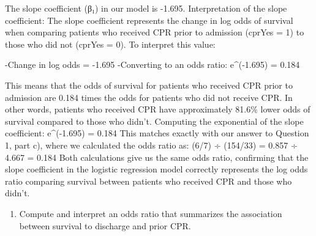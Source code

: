 \documentclass[
]{article}
\newenvironment{Shaded}{\begin{snugshade}}{\end{snugshade}}
\newcommand{\CommentTok}[1]{\textcolor[rgb]{0.56,0.35,0.01}{\textit{#1}}}
\newcommand{\FunctionTok}[1]{\textcolor[rgb]{0.13,0.29,0.53}{\textbf{#1}}}
\newcommand{\NormalTok}[1]{#1}
\newcommand{\OtherTok}[1]{\textcolor[rgb]{0.56,0.35,0.01}{#1}}
\newcommand{\SpecialCharTok}[1]{\textcolor[rgb]{0.81,0.36,0.00}{\textbf{#1}}}
\newcommand{\StringTok}[1]{\textcolor[rgb]{0.31,0.60,0.02}{#1}}
\providecommand{\tightlist}{%
  \setlength{\itemsep}{0pt}\setlength{\parskip}{0pt}}
\begin{document}
The slope coefficient (β₁) in our model is -1.695. Interpretation of the
slope coefficient: The slope coefficient represents the change in log
odds of survival when comparing patients who received CPR prior to
admission (cprYes = 1) to those who did not (cprYes = 0). To interpret
this value:

-Change in log odds = -1.695 -Converting to an odds ratio: e\^{}(-1.695)
= 0.184

This means that the odds of survival for patients who received CPR prior
to admission are 0.184 times the odds for patients who did not receive
CPR. In other words, patients who received CPR have approximately 81.6\%
lower odds of survival compared to those who didn't. Computing the
exponential of the slope coefficient: e\^{}(-1.695) = 0.184 This matches
exactly with our answer to Question 1, part c), where we calculated the
odds ratio as: (6/7) ÷ (154/33) = 0.857 ÷ 4.667 = 0.184 Both
calculations give us the same odds ratio, confirming that the slope
coefficient in the logistic regression model correctly represents the
log odds ratio comparing survival between patients who received CPR and
those who didn't.

\begin{enumerate}
\def\labelenumi{\alph{enumi})}
\setcounter{enumi}{3}
\tightlist
\item
  Compute and interpret an odds ratio that summarizes the association
  between survival to discharge and prior CPR.
\end{enumerate}

\begin{Shaded}
\end{Shaded}
\end{document}
